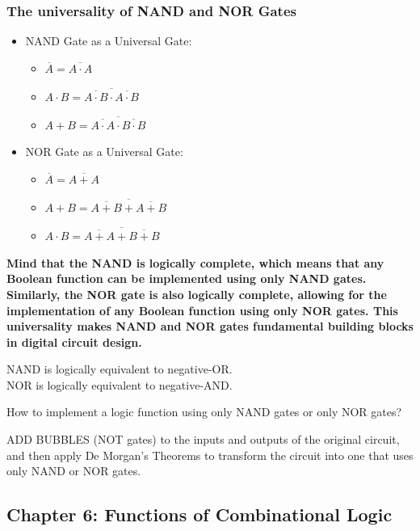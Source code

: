 \documentclass[
  a4paper,
]{article}
\providecommand{\tightlist}{%
  \setlength{\itemsep}{0pt}\setlength{\parskip}{0pt}}
\begin{document}
\subsubsection{The universality of NAND and NOR
Gates}\label{the-universality-of-nand-and-nor-gates}

\begin{itemize}
\tightlist
\item
  NAND Gate as a Universal Gate:

  \begin{itemize}
  \tightlist
  \item
    \(\overline{A} = \overline{A \cdot A}\)
  \item
    \(A \cdot B = \overline{\overline{A \cdot B} \cdot \overline{A \cdot B}}\)
  \item
    \(A + B = \overline{\overline{A \cdot A} \cdot \overline{B \cdot B}}\)
  \end{itemize}
\item
  NOR Gate as a Universal Gate:

  \begin{itemize}
  \tightlist
  \item
    \(\overline{A} = \overline{A + A}\)
  \item
    \(A + B = \overline{\overline{A + B} + \overline{A + B}}\)
  \item
    \(A \cdot B = \overline{\overline{A + A} + \overline{B + B}}\)
  \end{itemize}
\end{itemize}

\textbf{Mind that the NAND is logically complete, which means that any
Boolean function can be implemented using only NAND gates. Similarly,
the NOR gate is also logically complete, allowing for the implementation
of any Boolean function using only NOR gates. This universality makes
NAND and NOR gates fundamental building blocks in digital circuit
design.}

NAND is logically equivalent to negative-OR.\\
NOR is logically equivalent to negative-AND.

How to implement a logic function using only NAND gates or only NOR
gates?

ADD BUBBLES (NOT gates) to the inputs and outputs of the original
circuit, and then apply De Morgan's Theorems to transform the circuit
into one that uses only NAND or NOR gates.

\subsection{Chapter 6: Functions of Combinational
Logic}\label{chapter-6-functions-of-combinational-logic}
\end{document}
